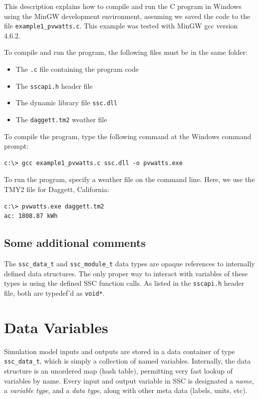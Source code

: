 \documentclass{scrartcl} %
\newcommand{\+}{\discretionary{\mbox{\scriptsize$\hookleftarrow$}}{}{}}
\begin{document}
This description explains how to compile and run the C program in Windows using the  MinGW development environment, assuming we saved the code to the file \texttt{example1\_pvwatts.c}. This example was tested with MinGW gcc version 4.6.2.

To compile and run the program, the following files must be in the same folder:

\begin{itemize}
\item The \texttt{.c} file containing the program code
\item The \texttt{sscapi.h} header file
\item The dynamic library file \texttt{ssc.dll}
\item The \texttt{daggett.tm2} weather file
\end{itemize}

To compile the program, type the following command at the Windows command prompt:

\begin{verbatim}
c:\> gcc example1_pvwatts.c ssc.dll -o pvwatts.exe
\end{verbatim}

To run the program, specify a weather file on the command line. Here, we use the TMY2 file for Daggett, California:

\begin{verbatim}
c:\> pvwatts.exe daggett.tm2
ac: 1808.87 kWh
\end{verbatim}

\subsection{Some additional comments}

The \texttt{ssc\_data\_t} and \texttt{ssc\_module\_t} data types are opaque references to internally defined data structures.  The only proper way to interact with variables of these types is using the defined SSC function calls.  As listed in the \texttt{sscapi.h} header file, both are typedef'd as \texttt{void*}.


\section{Data Variables}
\label{sec_variables}

Simulation model inputs and outputs are stored in a data container of type \texttt{ssc\_data\_t}, which is simply a collection of named variables.  Internally, the data structure is an unordered map (hash table), permitting very fast lookup of variables by name.  Every input and output variable in SSC is designated a \emph{name}, a \emph{variable type}, and a \emph{data type}, along with other meta data (labels, units, etc). 
\end{document}
